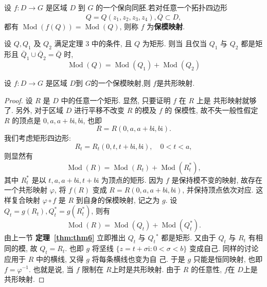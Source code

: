 \begin{defi}[保模映射]\label{def: 保模映射}
    设 $f\colon D\to G$ 是区域 $D$ 到 $G$ 的一个保向同胚.若对任意一个拓扑四边形
    \[Q=Q(z_1,z_2,z_3,z_4),\overline{Q}\subset D,\]
    都有 $\operatorname{Mod}(f(Q))=\operatorname{Mod}(Q)$, 则称 $f$ 为\textbf{保模映射}.
\end{defi}
\begin{thm}\label{thm:thm6}
    设 $Q, Q_1$ 及 $Q_2$ 满足定理 3 中的条件, 且 $Q$ 为矩形. 则当
且仅当 $Q_1$ 与 $Q_2$ 都是矩形且 $\bar{Q}_1 \cup \bar{Q}_2=\bar{Q}$ 时,
$$
\operatorname{Mod}(Q)=\operatorname{Mod}\left(Q_1\right)+\operatorname{Mod}\left(Q_2\right)
$$
\end{thm}
\begin{thm}
    设 $f\colon D\to G$ 是区域 $D$到 $G$的一个保模映射,则 $f$是共形映射. 
\end{thm}
\begin{proof}
    设 $R$ 是 $D$ 中的任意一个矩形. 显然, 只要证明 $f$ 在 $R$ 上是 共形映射就够了. 另外, 对于区域 $D$ 进行平移不改变 $R$ 的模及 $f$ 的 保模性, 故不失一般性假定 $R$ 的顶点是 $0, a, a+b \mathrm{i}, b \mathrm{i}$, 也即
$$
R=R(0, a, a+b \mathrm{i}, b \mathrm{i}) .
$$
我们考虑矩形四边形:
$$
R_t=R_t(0, t, t+b \mathrm{i}, b \mathrm{i}), \quad 0<t<a,
$$
则显然有
$$
\operatorname{Mod}(R)=\operatorname{Mod}\left(R_t\right)+\operatorname{Mod}\left(R_t^*\right),
$$
其中 $R_t^*$ 是以 $t, a, a+b \mathrm{i}, t+b \mathrm{i}$ 为顶点的矩形.
因为 $f$ 是保持模不变的映射, 故存在一个共形映射 $\varphi$, 将 $f(R)$ 变成 $R=R(0, a, a+b \mathrm{i}, b \mathrm{i})$, 并保持顶点依次对应. 这样复合映射 $\varphi \circ f$ 是 $R$ 到自身的保模映射, 记之为 $g$.
设 $Q_t=g\left(R_t\right), Q_t^*=g\left(R_t^*\right)$, 则有
$$
\operatorname{Mod}(R)=\operatorname{Mod}\left(Q_t\right)+\operatorname{Mod}\left(Q_t^*\right) .
$$
由上一节 \textbf{定理~\ref{thm:thm6}} 立即推出 $Q_t$ 与 $Q_t{ }^*$ 都是矩形. 又由于 $Q_t$ 与 $R_t$ 有相 同的模, 故 $Q_t=R_t$. 也即 $g$ 将坚线 $\{z=t+\sigma \mathrm{i}: 0<\sigma<b\}$ 变成自己.
同样的讨论应用于 $R$ 中的横线, 又得 $g$ 将每条横线也变为自
己. 于是 $g$ 只能是恒同映射, 也即 $f=\varphi^{-1}$. 也就是说, 当 $f$ 限制在 $R$上时是共形映射. 由于 $R$ 的任意性, $f$在 $D$上是共形映射.
\end{proof}
